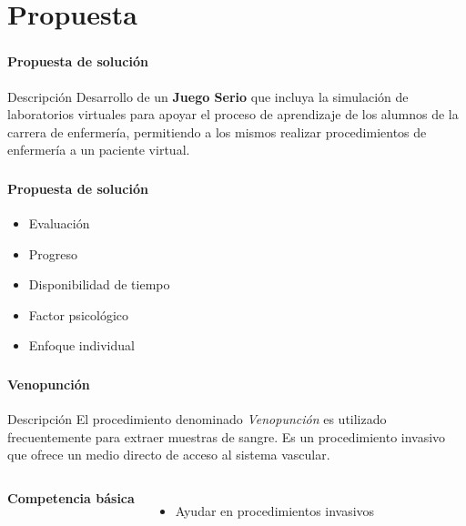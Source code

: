 \section{Propuesta}
\setcounter{sectiontotal}{6}

\begin{frame}
\frametitle{\pagetitle}
\framesubtitle{Propuesta de solución}
\pause{}
\begin{block}{Descripción}
\centering
Desarrollo de un \textbf{Juego Serio} que incluya la simulación de
laboratorios virtuales para apoyar el proceso de aprendizaje de los alumnos
de la carrera de enfermería, permitiendo a los mismos realizar
procedimientos de enfermería a un paciente virtual.
\end{block}
\end{frame}

\begin{frame}
\frametitle{\pagetitle}
\framesubtitle{Propuesta de solución}

\begin{itemize}[<+->]
\item Evaluación
\item Progreso
\item Disponibilidad de tiempo
\item Factor psicológico
\item Enfoque individual
\end{itemize}
\end{frame}


\begin{frame}
    \frametitle{\pagetitle}
    \framesubtitle{Venopunción}

    \pause{}
    
    \begin{block}{Descripción}
    \centering
    El procedimiento denominado \emph{Venopunción} es utilizado
    frecuentemente para extraer muestras de sangre. Es un procedimiento invasivo
    que ofrece un medio directo de acceso al sistema vascular. 
    \end{block}

	\begin{columns}
	 \hspace{0.5cm}
    \centering
    
     \hspace{0.5cm}
    \textbf{Competencia básica}
    \begin{itemize}
	\item Ayudar en procedimientos invasivos
	\end{itemize}
	\end{columns}

\end{frame}

